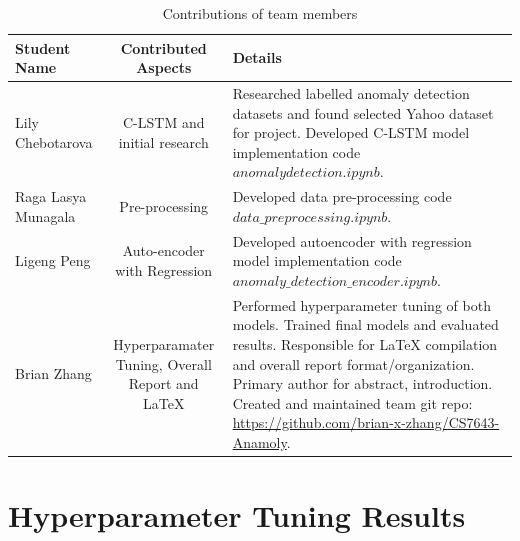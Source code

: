 \documentclass[10pt,twocolumn,letterpaper]{article}
\begin{document}
\newpage
\onecolumn
\begin{appendices}

   \begin{table}
   \begin{tabular}{|l|c|p{6cm}|}
   \hline
   Student Name & Contributed Aspects & Details \\
   \hline\hline
   Lily Chebotarova            & C-LSTM and initial research  & Researched labelled anomaly detection datasets and found selected Yahoo dataset for project. Developed C-LSTM model implementation code \(anomalydetection.ipynb\). \\ \hline 
   Raga Lasya Munagala         & Pre-processing & Developed data pre-processing code \(data\_preprocessing.ipynb\). \\ \hline
   Ligeng Peng                 & Auto-encoder with Regression  & Developed autoencoder with regression model implementation code \(anomaly\_detection\_encoder.ipynb\). \\ \hline
   Brian Zhang                 & Hyperparamater Tuning, Overall Report and LaTeX  & Performed hyperparameter tuning of both models. Trained final models and evaluated results. Responsible for LaTeX compilation and overall report format/organization. Primary author for abstract, introduction. Created and maintained team git repo: \url{https://github.com/brian-x-zhang/CS7643-Anamoly}. \\ \hline
   \hline
   \end{tabular}
   \caption{Contributions of team members}
   \label{tab:contributions}
   \end{table}


\section{Hyperparameter Tuning Results}
   \tiny{

}
\end{appendices}
\end{document}
